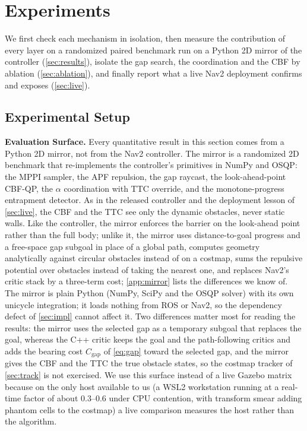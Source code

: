 \section{Experiments}\label{sec:experiments}

We first check each mechanism in isolation, then measure the contribution of every layer on a randomized paired benchmark run on a Python 2D mirror of the controller (\cref{sec:results}), isolate the gap search, the coordination and the CBF by ablation (\cref{sec:ablation}), and finally report what a live Nav2 deployment confirms and exposes (\cref{sec:live}).

\subsection{Experimental Setup}\label{sec:setup}

\noindent\textbf{Evaluation Surface.} Every quantitative result in this section comes from a Python 2D mirror, not from the Nav2 controller. The mirror is a randomized 2D benchmark that re-implements the controller's primitives in NumPy and OSQP: the MPPI sampler, the APF repulsion, the gap raycast, the look-ahead-point CBF-QP, the $\alpha$ coordination with TTC override, and the monotone-progress entrapment detector. As in the released controller and the deployment lesson of \cref{sec:live}, the CBF and the TTC see only the dynamic obstacles, never static walls. Like the controller, the mirror enforces the barrier on the look-ahead point rather than the full body; unlike it, the mirror uses distance-to-goal progress and a free-space gap subgoal in place of a global path, computes geometry analytically against circular obstacles instead of on a costmap, sums the repulsive potential over obstacles instead of taking the nearest one, and replaces Nav2's critic stack by a three-term cost; \cref{app:mirror} lists the differences we know of. The mirror is plain Python (NumPy, SciPy and the OSQP solver) with its own unicycle integration; it loads nothing from ROS or Nav2, so the dependency defect of \cref{sec:impl} cannot affect it. Two differences matter most for reading the results: the mirror uses the selected gap as a temporary subgoal that replaces the goal, whereas the C++ critic keeps the goal and the path-following critics and adds the bearing cost $C_{\mathrm{gap}}$ of \eqref{eq:gap} toward the selected gap, and the mirror gives the CBF and the TTC the true obstacle states, so the costmap tracker of \cref{sec:track} is not exercised. We use this surface instead of a live Gazebo matrix because on the only host available to us (a WSL2 workstation running at a real-time factor of about $0.3$--$0.6$ under CPU contention, with transform smear adding phantom cells to the costmap) a live comparison measures the host rather than the algorithm.


